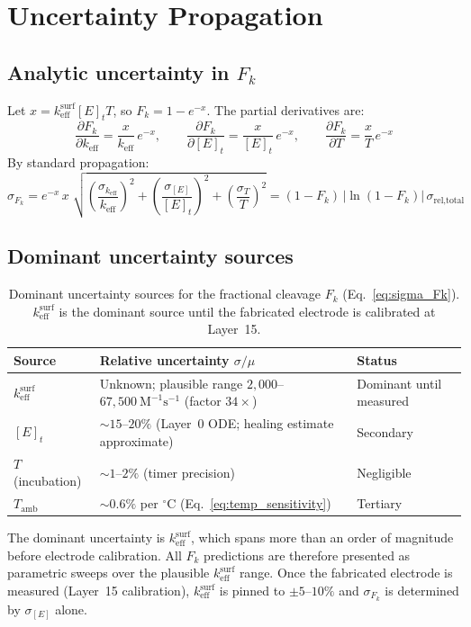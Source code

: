 \documentclass[10pt,a4paper]{article}
\numberwithin{equation}{section}
\newcommand{\Mms}{\text{M}^{-1}\text{s}^{-1}}
\newcommand{\keff}{k_{\text{eff}}}
\begin{document}
\section{Uncertainty Propagation}
\label{sec:uncertainty}

\subsection{Analytic uncertainty in $F_k$}

Let $x = \keff^{\text{surf}}[E]_t T$, so $F_k = 1 - e^{-x}$. The partial
derivatives are:
\begin{equation}
  \label{eq:partials}
  \frac{\partial F_k}{\partial \keff} = \frac{x}{\keff}\,e^{-x}, \qquad
  \frac{\partial F_k}{\partial [E]_t} = \frac{x}{[E]_t}\,e^{-x}, \qquad
  \frac{\partial F_k}{\partial T} = \frac{x}{T}\,e^{-x}
\end{equation}
By standard propagation:
\begin{equation}
  \label{eq:sigma_Fk}
  \sigma_{F_k} = e^{-x}\,x\;\sqrt{
    \left(\frac{\sigma_{\keff}}{\keff}\right)^2
    +\left(\frac{\sigma_{[E]}}{[E]_t}\right)^2
    +\left(\frac{\sigma_T}{T}\right)^2}
  = (1-F_k)\,\left|\ln(1-F_k)\right|\,\sigma_{\text{rel,total}}
\end{equation}

\subsection{Dominant uncertainty sources}

\begin{table}[H]
\centering
\small\renewcommand{\arraystretch}{1.25}
\begin{tabularx}{\linewidth}{@{}lXl@{}}
\toprule
Source & Relative uncertainty $\sigma/\mu$ & Status \\
\midrule
$\keff^{\text{surf}}$ & Unknown; plausible range $2{,}000$--$67{,}500\ \Mms$ (factor $34\times$) & Dominant until measured \\
$[E]_t$ & $\sim15$--$20\%$ (Layer~0 ODE; healing estimate approximate) & Secondary \\
$T$ (incubation) & $\sim1$--$2\%$ (timer precision) & Negligible \\
$T_{\text{amb}}$ & $\sim0.6\%$ per ${}^\circ$C (Eq.~\ref{eq:temp_sensitivity}) & Tertiary \\
\bottomrule
\end{tabularx}
\caption{Dominant uncertainty sources for the fractional cleavage $F_k$
(Eq.~\eqref{eq:sigma_Fk}).
$\keff^{\text{surf}}$ is the dominant source until the fabricated electrode
is calibrated at Layer~15.}
\label{tab:uncertainty}
\end{table}
The dominant uncertainty is $\keff^{\text{surf}}$, which spans more than an order of
magnitude before electrode calibration. All $F_k$ predictions are therefore presented
as parametric sweeps over the plausible $\keff^{\text{surf}}$ range. Once the
fabricated electrode is measured (Layer~15 calibration), $\keff^{\text{surf}}$ is
pinned to $\pm 5$--$10\%$ and $\sigma_{F_k}$ is determined by $\sigma_{[E]}$ alone.
\end{document}
